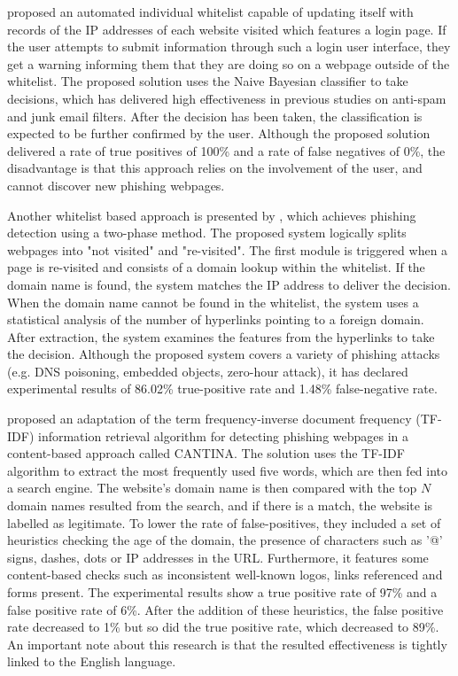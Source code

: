 \cite{Ye_Cao} proposed an automated individual whitelist capable of updating itself with records of the IP addresses of each website visited which features a login page. If the user attempts to submit information through such a login user interface, they get a warning informing them that they are doing so on a webpage outside of the whitelist. The proposed solution uses the Naive Bayesian classifier to take decisions, which has delivered high effectiveness in previous studies on anti-spam \citep{Ion_Androutsopoulos} and junk email \citep{Mehran_Sahami} filters. After the decision has been taken, the classification is expected to be further confirmed by the user. Although the proposed solution delivered a rate of true positives of 100\% and a rate of false negatives of 0\%, the disadvantage is that this approach relies on the involvement of the user, and cannot discover new phishing webpages.

Another whitelist based approach is presented by \cite{Jain}, which achieves phishing detection using a two-phase method. The proposed system logically splits webpages into "not visited" and "re-visited". The first module is triggered when a page is re-visited and consists of a domain lookup within the whitelist. If the domain name is found, the system matches the IP address to deliver the decision. When the domain name cannot be found in the whitelist, the system uses a statistical analysis of the number of hyperlinks pointing to a foreign domain. After extraction, the system examines the features from the hyperlinks to take the decision. Although the proposed system covers a variety of phishing attacks (e.g. DNS poisoning, embedded objects, zero-hour attack), it has declared experimental results of 86.02\% true-positive rate and 1.48\% false-negative rate.

\cite{Yue_Zhang} proposed an adaptation of the term frequency-inverse document frequency (TF-IDF) information retrieval algorithm for detecting phishing webpages in a content-based approach called CANTINA. The solution uses the TF-IDF algorithm to extract the most frequently used five words, which are then fed into a search engine. The website's domain name is then compared with the top \(N\) domain names resulted from the search, and if there is a match, the website is labelled as legitimate.
To lower the rate of false-positives, they included a set of heuristics checking the age of the domain, the presence of characters such as '@' signs, dashes, dots or IP addresses in the URL. Furthermore, it features some content-based checks such as inconsistent well-known logos, links referenced and forms present. The experimental results show a true positive rate of 97\% and a false positive rate of 6\%. After the addition of these heuristics, the false positive rate decreased to 1\% but so did the true positive rate, which decreased to 89\%. An important note about this research is that the resulted effectiveness is tightly linked to the English language.

